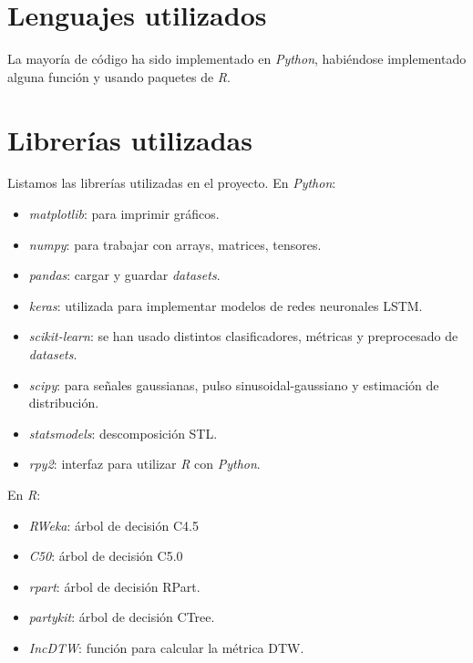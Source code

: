 \section{Lenguajes utilizados}

La mayoría de código ha sido implementado en \emph{Python}, habiéndose implementado alguna función y usando paquetes de \emph{R}.

\section{Librerías utilizadas}

Listamos las librerías utilizadas en el proyecto. En \emph{Python}:

\begin{itemize}
  \item \emph{matplotlib}: para imprimir gráficos.
  \item \emph{numpy}: para trabajar con arrays, matrices, tensores.
  \item \emph{pandas}: cargar y guardar \emph{datasets}.
  \item \emph{keras}: utilizada para implementar modelos de redes neuronales LSTM.
  \item \emph{scikit-learn}: se han usado distintos clasificadores, métricas y preprocesado de \emph{datasets}.
  \item \emph{scipy}: para señales gaussianas, pulso sinusoidal-gaussiano y estimación de distribución.
  \item \emph{statsmodels}: descomposición STL.
  \item \emph{rpy2}: interfaz para utilizar \emph{R} con \emph{Python}.
\end{itemize}

En \emph{R}:

\begin{itemize}
  \item \emph{RWeka}: árbol de decisión C4.5
  \item \emph{C50}: árbol de decisión C5.0
  \item \emph{rpart}: árbol de decisión RPart.
  \item \emph{partykit}: árbol de decisión CTree.
  \item \emph{IncDTW}: función para calcular la métrica DTW.
\end{itemize}

\endinput

